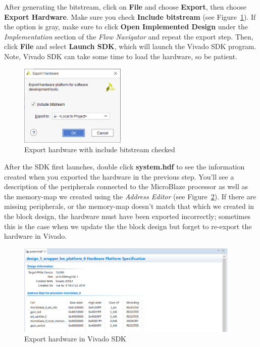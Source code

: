 \documentclass[11pt]{article}
\begin{document}
After generating the bitstream, click on \textbf{File} and choose \textbf{Export}, then choose \textbf{Export Hardware}. Make sure you check \textbf{Include bitstream} (see Figure~\ref{fig:export_hw}). If the option is gray, make sure to click \textbf{Open Implemented Design} under the \textit{Implementation} section of the \textit{Flow Navigator} and repeat the export step. Then, click \textbf{File} and select \textbf{Launch SDK}, which will launch the Vivado SDK program. Note, Vivado SDK can take some time to load the hardware, so be patient.

\begin{figure}[!b]
    \centering
    \includegraphics[width=0.45\textwidth]{images/export_hw.png}
    \caption{Export hardware with include bitstream checked}
    \label{fig:export_hw}
\end{figure}

After the SDK first launches, double click \textbf{system.hdf} to see the information created when you exported the hardware in the previous step. You'll see a description of the peripherals connected to the MicroBlaze processor as well as the memory-map we created using the \textit{Address Editor} (see Figure~\ref{fig:export_hdf}). If there are missing peripherals, or the memory-map doesn't match that which we created in the block design, the hardware must have been exported incorrectly; sometimes this is the case when we update the the block design but forget to re-export the hardware in Vivado.

\begin{figure}[h]
    \centering
    \includegraphics[width=0.95\textwidth]{images/export_hdf.png}
    \caption{Export hardware in Vivado SDK}
    \label{fig:export_hdf}
\end{figure}
\end{document}
